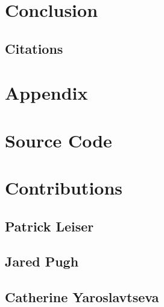 \documentclass{article}
\begin{document}
\section{Conclusion}

\begin{center}


\section*{Citations}

\end{center}

\section{Appendix}
\appendix

\section{Source Code}

\section{Contributions}

\subsection{Patrick Leiser}

\subsection{Jared Pugh}

\subsection{Catherine Yaroslavtseva}
\end{document}
